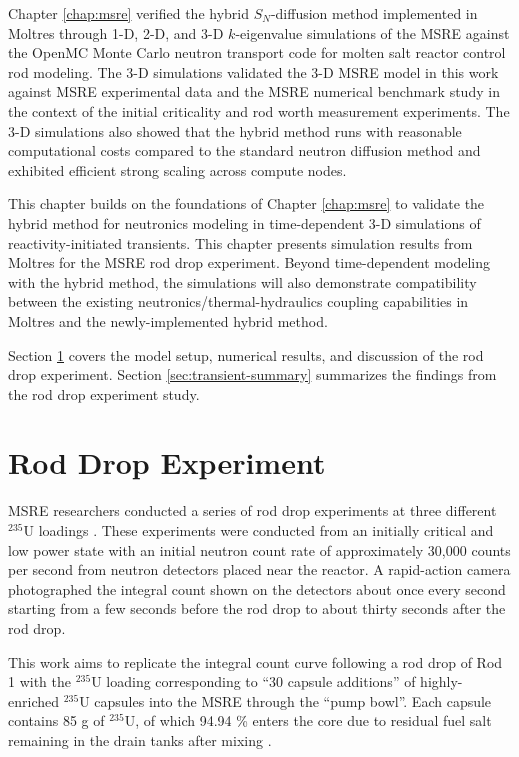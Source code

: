 Chapter \ref{chap:msre} verified the hybrid $S_N$-diffusion method implemented in Moltres through
1-D, 2-D, and 3-D
$k$-eigenvalue simulations of the \gls{MSRE} against the OpenMC Monte Carlo neutron transport code
for molten salt reactor control rod modeling. The 3-D simulations validated the 3-D \gls{MSRE}
model in this work against \gls{MSRE} experimental data and the \gls{MSRE} numerical benchmark
study \cite{fratoni_molten_2020} in the context of the initial criticality and rod worth
measurement experiments. The 3-D simulations also showed that the hybrid method runs with
reasonable computational costs compared to the standard neutron diffusion method and exhibited
efficient strong scaling across compute nodes.

This chapter builds on the foundations of Chapter \ref{chap:msre} to validate the hybrid
method for neutronics modeling in time-dependent 3-D simulations of reactivity-initiated
transients. This chapter presents simulation results from Moltres for the \gls{MSRE} rod drop
experiment. Beyond time-dependent modeling with the hybrid method, the simulations will also
demonstrate compatibility between the existing neutronics/thermal-hydraulics coupling
capabilities in Moltres and the newly-implemented hybrid method.

Section \ref{sec:rod-drop} covers the model setup, numerical results, and discussion of the rod
drop experiment.
Section \ref{sec:transient-summary}
summarizes the findings from the rod drop experiment study.

\section{Rod Drop Experiment} \label{sec:rod-drop}

\gls{MSRE} researchers conducted a series of rod drop experiments at three different $^{235}$U
loadings \cite{prince_zero-power_1968}. These experiments were conducted from an initially critical
and low power state with an initial neutron count rate of approximately 30,000 counts per second
from neutron detectors placed near the reactor. A rapid-action camera photographed the integral
count shown on the detectors about once every second starting from a few seconds before the rod
drop to about thirty seconds after the rod drop.

This work aims to replicate the integral count curve following a rod drop of Rod 1 with the
$^{235}$U loading corresponding to ``30 capsule additions'' of highly-enriched $^{235}$U capsules
into the \gls{MSRE} through the ``pump bowl''. Each capsule contains 85 g of $^{235}$U, of which
94.94 \% enters the core
due to residual fuel salt remaining in the drain tanks after mixing \cite{fratoni_molten_2020}.

